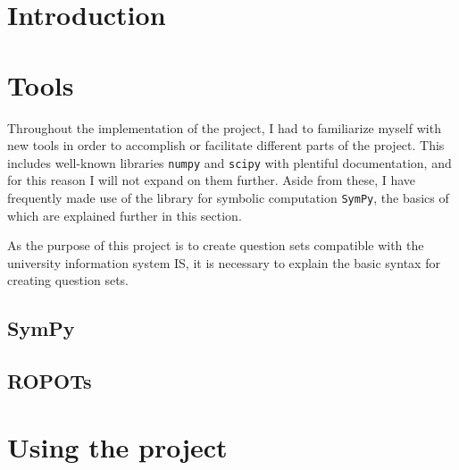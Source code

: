 \documentclass[
  digital, %
  table,   %
  twoside, %
  nolof,     %
  nolot,     %
  draft=false,
  final,
]{fithesis3}
\begin{document}
\chapter{Introduction}




\chapter{Tools}

Throughout the implementation of the project, I had to familiarize myself with new tools in order to accomplish or facilitate different parts of the project. This includes well-known libraries \verb|numpy| and \verb|scipy| with plentiful documentation, and for this reason I will not expand on them further. Aside from these, I have frequently made use of the library for symbolic computation \verb|SymPy|, the basics of which are explained further in this section. 

As the purpose of this project is to create question sets compatible with the university information system IS, it is necessary to explain the basic syntax for creating question sets. 

\section{SymPy}



\section{ROPOTs}



\chapter{Using the project}
\end{document}
